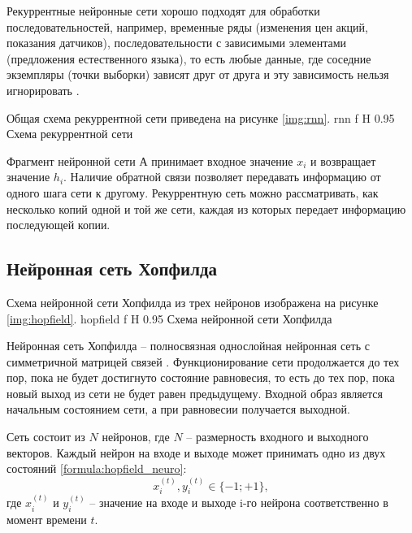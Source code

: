Рекуррентные нейронные сети хорошо подходят для обработки последовательностей, например, временные ряды (изменения цен акций, показания датчиков), последовательности с зависимыми элементами (предложения естественного языка), то есть любые данные, где соседние экземпляры (точки выборки) зависят друг от друга и эту зависимость нельзя игнорировать \cite{дель2021прогноз}.

Общая схема рекуррентной сети приведена на рисунке \ref{img:rnn}.
{rnn} %
{f} %
{H} %
{0.95\textwidth} %
{Схема рекуррентной сети} %

Фрагмент нейронной сети А принимает входное значение $x_i$ и возвращает значение $h_i$. 
Наличие обратной связи позволяет передавать информацию от одного шага сети к другому. 
Рекуррентную сеть можно рассматривать, как несколько копий одной и той же сети, каждая из которых передает информацию последующей копии.

\subsection{Нейронная сеть Хопфилда}
Схема нейронной сети Хопфилда из трех нейронов изображена на рисунке \ref{img:hopfield}.
{hopfield} %
{f} %
{H} %
{0.95\textwidth} %
{Схема нейронной сети Хопфилда} %

Нейронная сеть Хопфилда -- полносвязная однослойная нейронная сеть с симметричной матрицей связей \cite{ромасенко2022запоминание}.
Функционирование сети продолжается до тех пор, пока не будет достигнуто состояние равновесия, то есть до тех пор, пока новый выход из сети не будет равен предыдущему.
Входной образ является начальным состоянием сети, а при равновесии получается выходной.

Сеть состоит из $N$ нейронов, где $N$ -- размерность входного и выходного векторов.
Каждый нейрон на входе и выходе может принимать одно из двух состояний \ref{formula:hopfield_neuro}:
\begin{equation}\label{formula:hopfield_neuro}
	x_i^{(t)}, y_i^{(t)} \in \{-1; +1\},
\end{equation}
где $x_i^{(t)}$ и $y_i^{(t)}$ -- значение на входе и выходе i-го нейрона соответственно в момент времени $t$.


